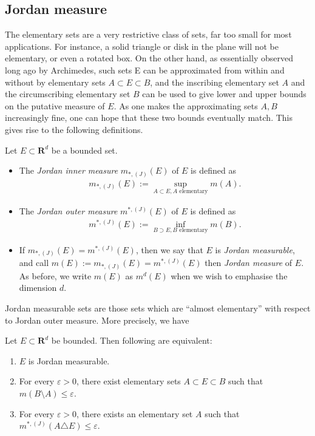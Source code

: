 \documentclass{book}
\theoremstyle{defstyle}
\theoremstyle{thmstyle}
\newcommand{\JIM}{m_{*, (J)}}%
\newcommand{\JOM}{m^{*, (J)}}%
\newcommand{\newa}{\vspace{1em}\indent}
\begin{document}
\subsection{Jordan measure}

The elementary sets are a very restrictive class of sets, far too small for most applications. For instance, a solid triangle or disk in the plane will not be elementary, or even a rotated box. On the other hand, as essentially observed long ago by Archimedes, such sets E can be approximated from within and without by elementary sets $A \subset E \subset B$, and the inscribing elementary set $A$ and the circumscribing elementary set $B$ can be used to give lower and upper bounds on the putative measure of $E$. As one makes the approximating sets $A,B$ increasingly fine, one can hope that these two bounds eventually match. This gives rise to the following definitions.

\begin{definition}\label{def:jordan measure}
    Let $E \subset \mathbf{R}^d$ be a bounded set.
    \begin{itemize}
        \item The \emph{Jordan inner measure} $\JIM(E)$ of $E$ is defined as
            \begin{align*}
                \JIM(E) := \sup_{A \subset E, A \text{ elementary}} m(A).
            \end{align*}
        \item The \emph{Jordan outer measure} $\JOM(E)$ of $E$ is defined as
            \begin{align*}
                \JOM(E) := \inf_{B \supset E, B \text{ elementary}} m(B).
            \end{align*}
        \item If $\JIM(E) = \JOM(E)$, then we say that $E$ is \emph{Jordan measurable}, and call $m(E) := \JIM(E) = \JOM(E)$ then \emph{Jordan measure} of $E$. As before, we write $m(E)$ as $m^d(E)$ when we wish to emphasise the dimension $d$.
    \end{itemize}
\end{definition}

\newa Jordan measurable sets are those sets which are ``almost elementary'' with respect to Jordan outer measure. More precisely, we have

\begin{proposition}\label{thm:Characterisation of Jordan measurability}
    Let $E \subset \mathbf{R}^d$ be bounded. Then following are equivalent:
    \begin{enumerate}
        \item $E$ is Jordan measurable.
        \item For every $\varepsilon > 0$, there exist elementary sets $A \subset E \subset B$ such that $m(B \setminus A) \leq \varepsilon$.
        \item For every $\varepsilon > 0$, there exists an elementary set $A$ such that $\JOM(A \triangle E) \leq \varepsilon$.
    \end{enumerate}
\end{proposition}
\end{document}
